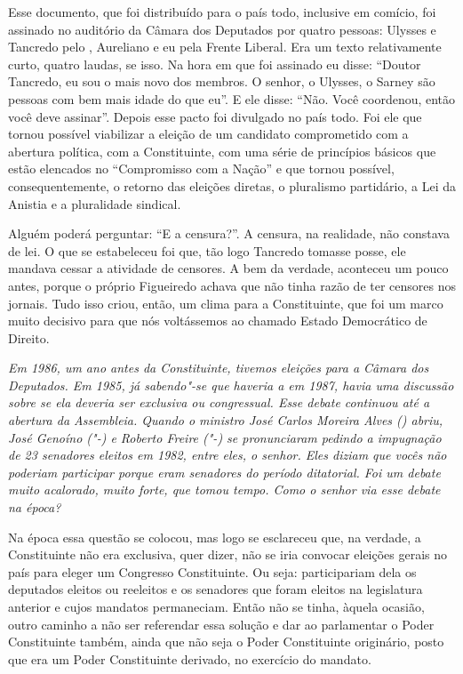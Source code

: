 Esse documento, que foi distribuído para o país todo, inclusive em
comício, foi assinado no auditório da Câmara dos Deputados por quatro
pessoas: Ulysses e Tancredo pelo , Aureliano e eu pela Frente
Liberal. Era um texto relativamente curto, quatro laudas, se isso. Na
hora em que foi assinado eu disse: ``Doutor Tancredo, eu sou o mais novo
dos membros. O senhor, o Ulysses, o Sarney são pessoas com bem mais
idade do que eu''. E ele disse: ``Não. Você coordenou, então você deve
assinar''. Depois esse pacto foi divulgado no país todo. Foi ele que
tornou possível viabilizar a eleição de um candidato comprometido com a
abertura política, com a Constituinte, com uma série de princípios
básicos que estão elencados no ``Compromisso com a Nação'' e que tornou
possível, consequentemente, o retorno das eleições diretas, o pluralismo
partidário, a Lei da Anistia e a pluralidade sindical.

Alguém poderá perguntar: ``E a censura?''. A censura, na realidade, não
constava de lei. O que se estabeleceu foi que, tão logo Tancredo tomasse
posse, ele mandava cessar a atividade de censores. A bem da verdade,
aconteceu um pouco antes, porque o próprio Figueiredo achava que não
tinha razão de ter censores nos jornais. Tudo isso criou, então, um
clima para a Constituinte, que foi um marco muito decisivo para que nós
voltássemos ao chamado Estado Democrático de Direito.

\medskip

\noindent\emph{Em 1986, um ano antes da Constituinte, tivemos eleições para a
Câmara dos Deputados. Em 1985, já sabendo"-se que haveria a  em 1987,
havia uma discussão sobre se ela deveria ser exclusiva ou congressual.
Esse debate continuou até a abertura da Assembleia. Quando o ministro
José Carlos Moreira Alves () abriu, José Genoíno ("-) e Roberto
Freire ("-) se pronunciaram pedindo a impugnação de 23 senadores
eleitos em 1982, entre eles, o senhor. Eles diziam que vocês não
poderiam participar porque eram senadores do período ditatorial. Foi um
debate muito acalorado, muito forte, que tomou tempo. Como o senhor via
esse debate na época?}

Na época essa questão se colocou, mas logo se
esclareceu que, na verdade, a Constituinte não era exclusiva, quer
dizer, não se iria convocar eleições gerais no país para eleger um
Congresso Constituinte. Ou seja: participariam dela os deputados eleitos
ou reeleitos e os senadores que foram eleitos na legislatura anterior e
cujos mandatos permaneciam. Então não se tinha, àquela ocasião, outro
caminho a não ser referendar essa solução e dar ao parlamentar o Poder
Constituinte também, ainda que não seja o Poder Constituinte originário,
posto que era um Poder Constituinte derivado, no exercício do mandato.

